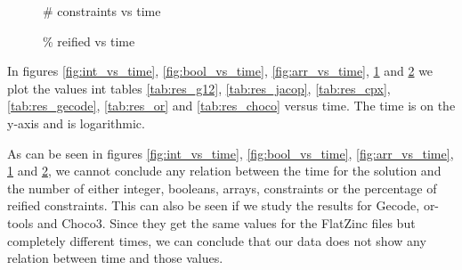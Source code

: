 \begin{figure}[H]
\centering

\caption{\# constraints vs time}
\label{fig:const_vs_time}
\end{figure}

\begin{figure}[H]
\centering

\caption{\% reified vs time}
\label{fig:reif_vs_time}
\end{figure}

In figures \ref{fig:int_vs_time}, \ref{fig:bool_vs_time}, \ref{fig:arr_vs_time}, \ref{fig:const_vs_time} and \ref{fig:reif_vs_time} we plot the values int tables \ref{tab:res_g12}, \ref{tab:res_jacop}, \ref{tab:res_cpx}, \ref{tab:res_gecode}, \ref{tab:res_or} and \ref{tab:res_choco} versus time. The time is on the y-axis and is logarithmic.

As can be seen in figures \ref{fig:int_vs_time}, \ref{fig:bool_vs_time}, \ref{fig:arr_vs_time}, \ref{fig:const_vs_time} and \ref{fig:reif_vs_time}, we cannot conclude any relation between the time for the solution and the number of either integer, booleans, arrays, constraints or the percentage of reified constraints. This can also be seen if we study the results for Gecode, or-tools and Choco3. Since they get the same values for the FlatZinc files but completely different times, we can conclude that our data does not show any relation between time and those values.
